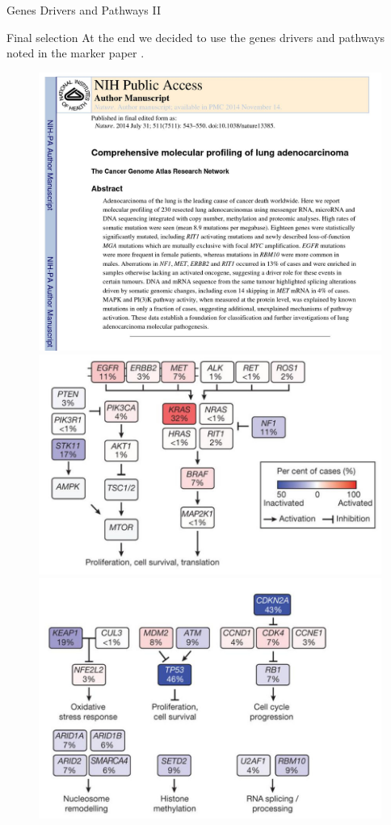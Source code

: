 \documentclass{beamer}
\begin{document}
\begin{frame}{Genes Drivers and Pathways II}
  \begin{block}{Final selection}
    At the end we decided to use the genes drivers and pathways noted in the
    marker paper \cite{luadmarker}. 
  \end{block}
  \begin{figure}
    \centering
    {%
      \includegraphics[scale = 0.14]{img/paper.jpg}%
    }%
    {%
      \includegraphics[scale = 0.85]{img/genes1.jpg}%
      \includegraphics[scale = 0.85]{img/genes2.jpg}%
}
\end{figure}
\end{frame}
\end{document}
